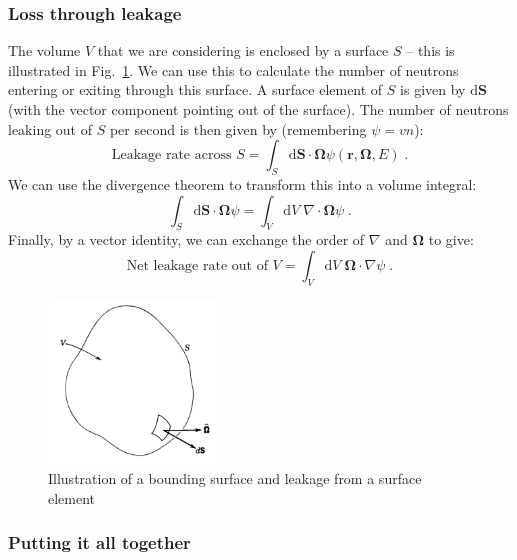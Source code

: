 \documentclass{article}
\begin{document}
\subsubsection{Loss through leakage}

The volume $V$ that we are considering is enclosed by a surface $S$ -- this is illustrated in Fig.~\ref{fig:surface}. We can use this to calculate the number of neutrons entering or exiting through this surface. A surface element of $S$ is given by $\mathrm{d}\mathbf{S}$ (with the vector component pointing out of the surface). The number of neutrons leaking out of $S$ per second is then given by (remembering $\psi = vn$):
\begin{equation}
    \textrm{Leakage rate across $S$} = \int_S \mathrm{d}\mathbf{S}\cdot\mathbf{\Omega}\psi(\mathbf{r},\mathbf{\Omega},E)\;\mathrm{.}
\end{equation}
We can use the divergence theorem to transform this into a volume integral:
\begin{equation}
    \int_S \mathrm{d}\mathbf{S}\cdot\mathbf{\Omega}\psi = \int_V \mathrm{d}V\; \nabla\cdot\mathbf{\Omega}\psi\;\mathrm{.}
\end{equation}
Finally, by a vector identity, we can exchange the order of $\nabla$ and $\mathbf{\Omega}$ to give:
\begin{equation}
    \textrm{Net leakage rate out of $V$} =\int_V \mathrm{d}V\; \mathbf{\Omega}\cdot\nabla\psi\;\mathrm{.}
\end{equation}

\begin{figure}[h]
        \centering
        \includegraphics[width=0.4\textwidth]{surface_leakage.png}
        \caption{Illustration of a bounding surface and leakage from a surface element~\cite{Duderstadt}}
        \label{fig:surface}
\end{figure}

\subsubsection{Putting it all together}
\end{document}
